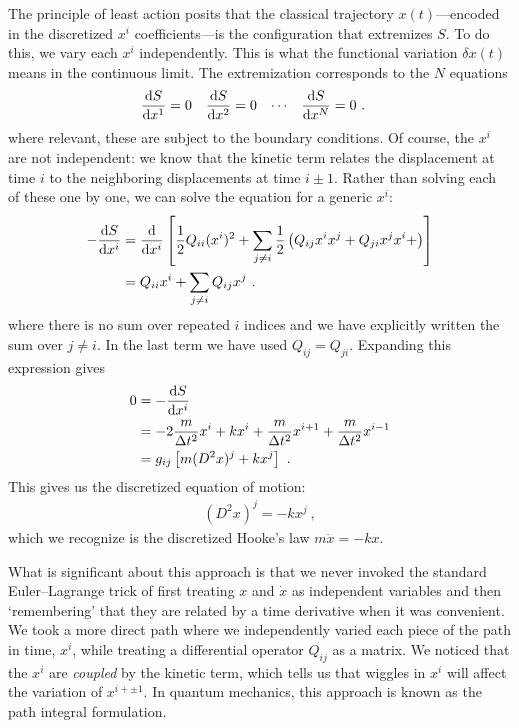 \documentclass[12pt, oneside]{report}    %
\begin{document}
The principle of least action posits that the classical trajectory $x(t)$---encoded in the discretized $x^i$ coefficients---is the configuration that extremizes $S$. To do this, we vary each $x^i$ independently. This is what the functional variation $\delta x(t)$ means in the continuous limit. The extremization corresponds to the $N$ equations
\begin{align}
    \frac{\operatorname{d}\!{S}}{\operatorname{d}\!{x^1}} &= 0
    &
    \frac{\operatorname{d}\!{S}}{\operatorname{d}\!{x^2}} &= 0
    &
    \cdots&
    &
    \frac{\operatorname{d}\!{S}}{\operatorname{d}\!{x^N}} &= 0 \ .
\end{align}
where relevant, these are subject to the boundary conditions. 
% 
Of course, the $x^i$ are not independent: we know that the kinetic term relates the displacement at time $i$ to the neighboring displacements at time $i\pm 1$.
% 
Rather than solving each of these one by one, we can solve the equation for a generic $x^i$:
\begin{align}
    -\frac{\operatorname{d}\!{S}}{\operatorname{d}\!{x^i}} &= 
    \frac{\operatorname{d}\!{}}{\operatorname{d}\!{x^i}}
    \left[
    \frac{1}{2} Q_{ii}(x^i)^2 + \sum_{j\neq i} \frac{1}{2}\left(Q_{ij} x^ix^j + Q_{ji}x^jx^i + \right) 
    \right] \\
    &= 
    Q_{ii}x^i+ \sum_{j\neq i} Q_{ij}x^j \ .
\end{align}
where there is no sum over repeated $i$ indices and we have explicitly written the sum over $j\neq i$. In the last term we have used $Q_{ij} = Q_{ji}$. Expanding this expression gives
\begin{align}
    0&=
    -\frac{\operatorname{d}\!{S}}{\operatorname{d}\!{x^i}}
    \\
    &=
    -2\frac{m}{\Delta t^2} x^i + k x^i 
    + \frac{m}{\Delta t^2}x^{i+1} 
    + \frac{m}{\Delta t^2}x^{i-1}
    \\
    &= 
    g_{ij}\left[m(D^2x)^j + k x^j\right] \ .
\end{align}
This gives us the discretized equation of motion:
\begin{align}
    (D^2x)^j = - k x^j \ ,
\end{align}
which we recognize is the discretized Hooke's law $m\ddot{x} = -k x$. 

What is significant about this approach is that we never invoked the standard Euler--Lagrange trick of first treating $x$ and $\dot{x}$ as independent variables and then `remembering' that they are related by a time derivative when it was convenient. We took a more direct path where we independently varied each piece of the path in time, $x^i$, while treating a differential operator $Q_{ij}$ as a matrix. We noticed that the $x^i$ are \emph{coupled} by the kinetic term, which tells us that wiggles in $x^i$ will affect the variation of $x^{i+\pm 1}$. In quantum mechanics, this approach is known as the path integral formulation.
\end{document}
